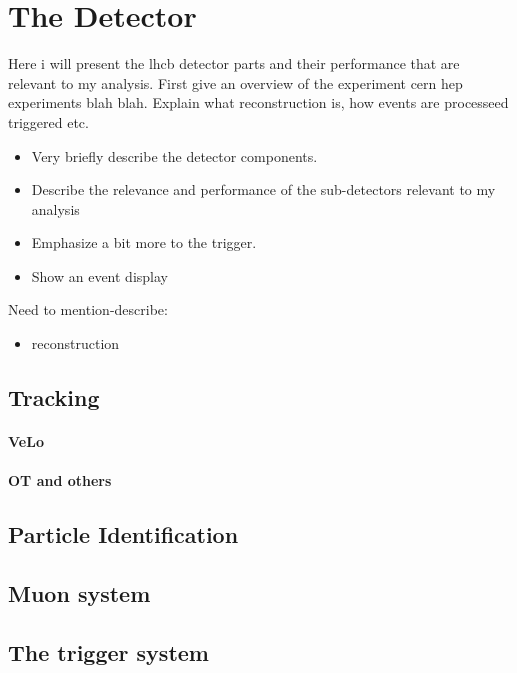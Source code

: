 

\chapter{The \lhcb Detector}
\label{lhcb_detector}

Here i will present the lhcb detector parts and their performance that are relevant to my analysis.
First give an overview of the experiment cern hep experiments blah blah. Explain what reconstruction
is, how events are processeed triggered etc.

\begin{itemize}
  \item Very briefly describe the detector components.
  \item Describe the relevance and performance of the sub-detectors relevant to my analysis
  \item Emphasize a bit more to the trigger.
  \item Show an event display
\end{itemize}

Need to mention-describe:
\begin{itemize}
  \item reconstruction
\end{itemize}



\section{Tracking}
\subsubsection{VeLo}
\subsubsection{OT and others}

\section{Particle Identification}

\section{Muon system}

\section{The trigger system}
\label{lhcb_trigger}

